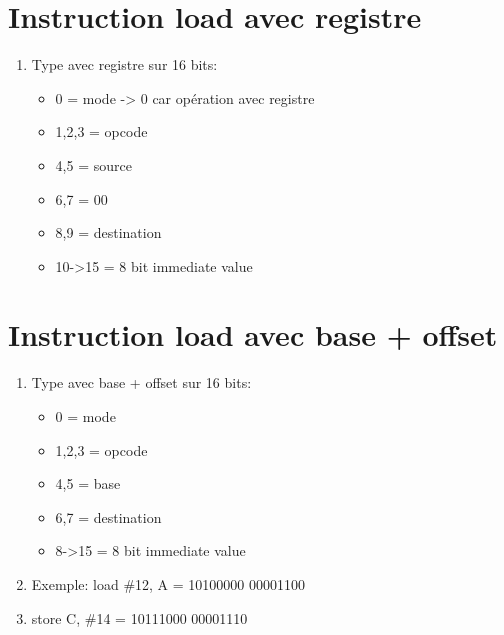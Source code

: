\section{Instruction load avec registre}
\begin{enumerate}
\item Type avec registre sur 16 bits:
\begin{itemize}
  \item 0 = mode -> 0 car opération avec registre
  \item 1,2,3 = opcode
  \item 4,5 = source
  \item 6,7 = 00
  \item 8,9 = destination
  \item 10->15 = 8 bit immediate value
\end{itemize}
\end{enumerate}

\section{Instruction load avec base + offset}
\begin{enumerate}
\item Type avec base + offset sur 16 bits:
\begin{itemize}
  \item 0 = mode
  \item 1,2,3 = opcode
  \item 4,5 = base
  \item 6,7 = destination 
  \item 8->15 = 8 bit immediate value
\end{itemize}
\item Exemple: load \#12, A = 10100000 00001100
\item store C, \#14 = 10111000 00001110
\end{enumerate}

